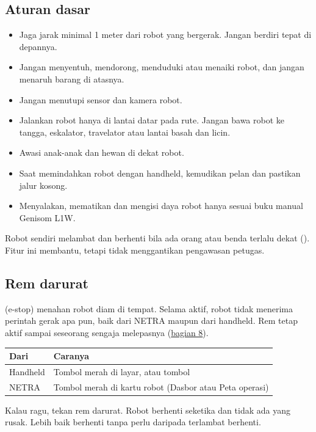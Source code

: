 \documentclass[11pt]{article}
\begin{document}
\subsection{Aturan dasar}
\begin{itemize}
  \item Jaga jarak minimal 1 meter dari robot yang bergerak. Jangan berdiri tepat di depannya.
  \item Jangan menyentuh, mendorong, menduduki atau menaiki robot, dan jangan menaruh barang di atasnya.
  \item Jangan menutupi sensor dan kamera robot.
  \item Jalankan robot hanya di lantai datar pada rute. Jangan bawa robot ke tangga, eskalator,
        travelator atau lantai basah dan licin.
  \item Awasi anak-anak dan hewan di dekat robot.
  \item Saat memindahkan robot dengan handheld, kemudikan pelan dan pastikan jalur kosong.
  \item Menyalakan, mematikan dan mengisi daya robot hanya sesuai buku manual Genisom L1W.
\end{itemize}

Robot sendiri melambat dan berhenti bila ada orang atau benda terlalu dekat (). Fitur ini
membantu, tetapi tidak menggantikan pengawasan petugas.

\subsection{Rem darurat}
 (e-stop) menahan robot diam di tempat. Selama aktif, robot tidak menerima perintah
gerak apa pun, baik dari NETRA maupun dari handheld. Rem tetap aktif sampai seseorang sengaja
melepasnya (\hyperref[sec:estop]{bagian 8}).

\begin{tabularx}{\linewidth}{@{}B{3.4cm}Y@{}}
\toprule
Dari & Caranya \\
\midrule
Handheld & Tombol merah  di layar, atau tombol  \\
NETRA & Tombol merah  di kartu robot (Dasbor atau Peta operasi) \\
\bottomrule
\end{tabularx}

\begin{penting}
Kalau ragu, tekan rem darurat. Robot berhenti seketika dan tidak ada yang rusak. Lebih baik berhenti
tanpa perlu daripada terlambat berhenti.
\end{penting}
\end{document}
